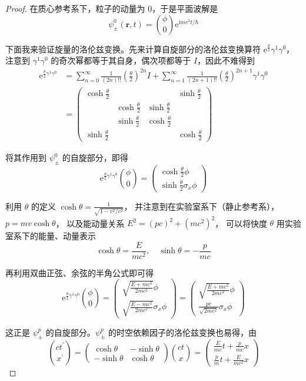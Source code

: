 \begin{proof}
在质心参考系下，粒子的动量为 $0$，于是平面波解是
$$\psi_{\pm}^{0}(\mathbf{r}, t)=\binom{\phi}{0} \mathrm{e}^{\mathrm{i} mc^{2} t / \hbar}$$

下面我来验证旋量的洛伦兹变换。先来计算自旋部分的洛伦兹变换算符 $\mathrm{e}^{\frac{\theta}{2}} \gamma^{1} \gamma^{0}$，
注意到 $\gamma^{1} \gamma^{0}$ 的奇次幂都等于其自身，偶次项都等于 $I$，因此不难得到
$$\begin{aligned}
\mathrm{e}^{\frac{\theta}{2} \gamma^{1} \gamma^{0}} 
& =\sum_{n=0}^{\infty} \frac{1}{(2n)!!}\left(\frac{\theta}{2}\right)^{2n} I
+\sum_{n=1}^{\infty} \frac{1}{(2n+1)!!}\left(\frac{\theta}{2}\right)^{2n+1} \gamma^{1} \gamma^{0} \\
& =\begin{pmatrix}
\cosh \frac{\theta}{2} & & & \sinh \frac{\theta}{2} \\
& \cosh \frac{\theta}{2} & \sinh \frac{\theta}{2} & \\
& \sinh \frac{\theta}{2} & \cosh \frac{\theta}{2} & \\
\sinh \frac{\theta}{2} & & & \cosh \frac{\theta}{2}
\end{pmatrix}
\end{aligned}$$

将其作用到 $\psi_{\pm}^{0}$ 的自旋部分，即得
$$\mathrm{e}^{\frac{\theta}{2} \gamma^{1} \gamma^{0}}\binom{\phi}{0}
=\begin{pmatrix}\cosh \frac{\theta}{2} \phi \\ 
\sinh \frac{\theta}{2} \sigma_{x} \phi\end{pmatrix}$$

利用 $\theta$ 的定义 $\cosh \theta=\frac{1}{\sqrt{1-v^{2} / c^{2}}}$，
并注意到在实验室系下（静止参考系），$p=m v \cosh \theta$，
以及能动量关系 $E^{2}=(pc)^{2}+(mc^{2})^{2}$，
可以将快度 $\theta$ 用实验室系下的能量、动量表示
$$\cosh \theta=\frac{E}{mc^{2}}, \quad \sinh \theta=-\frac{p}{mc}$$

再利用双曲正弦、余弦的半角公式即可得
$$\mathrm{e}^{\frac{\theta}{2} \gamma^{1} \gamma^{0}}\binom{\phi}{0}
=\begin{pmatrix}\sqrt{\frac{E+mc^{2}}{2mc^{2}}} \phi \\ \sqrt{\frac{E-mc^{2}}{2mc^{2}}} \sigma_{x} \phi\end{pmatrix}
=\begin{pmatrix}\sqrt{\frac{E+mc^{2}}{2mc^{2}}} \phi \\ \frac{pc}{\sqrt{2mc^{2}}} \sigma_{x} \phi\end{pmatrix}$$

这正是 $\psi_{\pm}^{p}$ 的自旋部分。$\psi_{\pm}^{p}$ 的时空依赖因子的洛伦兹变换也易得，由
$$\binom{c t^{\prime}}{x^{\prime}}=\begin{pmatrix}
\cosh \theta & -\sinh \theta \\
-\sinh \theta & \cosh \theta
\end{pmatrix}\binom{ct}{x}
=\begin{pmatrix}\frac{E}{mc} t+\frac{p}{mc} x \\ 
\frac{p}{m} t+\frac{E}{mc^{2}} x\end{pmatrix}$$


\end{proof}
